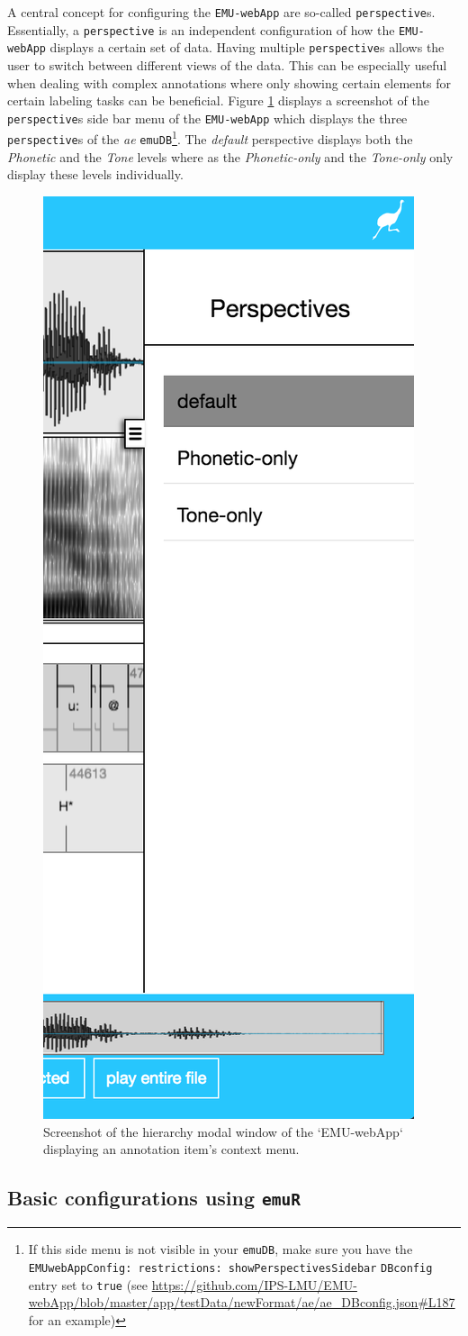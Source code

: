 \documentclass[]{book}
\let\rmarkdownfootnote\footnote%
\def\footnote{\protect\rmarkdownfootnote}
\begin{document}
A central concept for configuring the \texttt{EMU-webApp} are so-called \texttt{perspective}s. Essentially, a \texttt{perspective} is an independent configuration of how the \texttt{EMU-webApp} displays a certain set of data. Having multiple \texttt{perspective}s allows the user to switch between different views of the data. This can be especially useful when dealing with complex annotations where only showing certain elements for certain labeling tasks can be beneficial. Figure \ref{fig:webApp-perspMenu} displays a screenshot of the \texttt{perspective}s side bar menu of the \texttt{EMU-webApp} which displays the three \texttt{perspective}s of the \emph{ae} \texttt{emuDB}\footnote{If this side menu is not visible in your \texttt{emuDB}, make sure you have the \texttt{EMUwebAppConfig:\ restrictions:\ showPerspectivesSidebar} \texttt{DBconfig} entry set to \texttt{true} (see \url{https://github.com/IPS-LMU/EMU-webApp/blob/master/app/testData/newFormat/ae/ae_DBconfig.json\#L187} for an example)}. The \emph{default} perspective displays both the \emph{Phonetic} and the \emph{Tone} levels where as the \emph{Phonetic-only} and the \emph{Tone-only} only display these levels individually.

\begin{figure}

{\centering \includegraphics[width=0.25\linewidth]{pics/emu-webAppPerspMenu} 

}

\caption{Screenshot of the hierarchy modal window of the `EMU-webApp` displaying an annotation item's context menu.}\label{fig:webApp-perspMenu}
\end{figure}

\hypertarget{subsec:emu-webAppConfigWithEmuR}{%
\subsection{\texorpdfstring{Basic configurations using \texttt{emuR}}{Basic configurations using emuR}}\label{subsec:emu-webAppConfigWithEmuR}}
\end{document}
